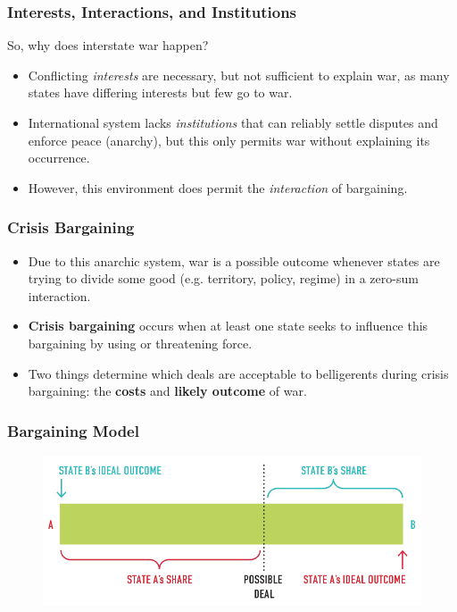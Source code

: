 \documentclass{beamer}
\begin{document}
\begin{frame} 
\frametitle{\LARGE{Interests, Interactions, and Institutions}}
So, why does interstate war happen?
\begin{itemize}
		\item Conflicting \emph{interests} are necessary, but not sufficient to explain war, as many states have differing interests but few go to war. \pause 
		\item International system lacks \emph{institutions} that can reliably settle disputes and enforce peace (anarchy), but this only permits war without explaining its occurrence. \pause 
		\item However, this environment does permit the \emph{interaction} of bargaining.
\end{itemize}
\end{frame}

\begin{frame} 
\frametitle{\LARGE{Crisis Bargaining}}
	\begin{itemize}
		\item Due to this anarchic system, war is a possible outcome whenever states are trying to divide some good (e.g. territory, policy, regime) in a zero-sum interaction. \pause
		\item \textbf{Crisis bargaining} occurs when at least one state seeks to influence this bargaining by using or threatening force. \pause
		\item Two things determine which deals are acceptable to belligerents during crisis bargaining: the \textbf{costs} and \textbf{likely outcome} of war. 
	\end{itemize}
\end{frame}

\begin{frame} 
\frametitle{\LARGE{Bargaining Model}}
\begin{figure}[ht!]
	\centering
	\includegraphics[width=\textwidth,height=0.8\textheight,keepaspectratio]{./barg1.png}
\end{figure}
\end{frame}
\end{document}
